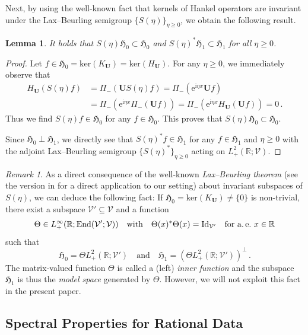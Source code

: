 \documentclass[11pt,reqno]{amsart}
\newtheorem{lem}{Lemma}[section]
\theoremstyle{definition}
\theoremstyle{remark}
\theoremstyle{remark}
\newtheorem*{remark*}{Remark}
\numberwithin{equation}{section}
\newcommand{\Hfr}{\mathfrak{H}}
\newcommand{\R}{\mathbb{R}}
\newcommand{\VV}{\mathcal{V}}
\renewcommand{\ker}{\mathrm{ker}}
\newcommand{\ii}{\mathrm{i}}
\newcommand{\eu}{\mathrm{e}}
\newcommand{\Ub}{\mathbf{U}}
\newcommand{\id}{\mathrm{Id}}
\begin{document}
Next, by using the well-known fact that kernels of Hankel operators are invariant under the Lax--Beurling semigroup $\{ S(\eta) \}_{\eta \geq 0}$, we obtain the following result.

\begin{lem} \label{lem:S_inv}
It holds that $S(\eta)\Hfr_0 \subset \Hfr_0$ and $S(\eta)^* \Hfr_1 \subset \Hfr_1$ for all $\eta \geq 0$.
\end{lem}

\begin{proof}
Let $f \in \Hfr_0 = \ker(K_{\Ub}) = \ker(H_{\Ub})$. For any $\eta \geq 0$, we immediately observe that
\begin{align*}
H_{\Ub}(S(\eta) f) & = \Pi_-(\Ub S(\eta) f) = \Pi_- (\eu^{\ii \eta x} \Ub f) \\
& = \Pi_- (\eu^{\ii \eta x} \Pi_-(\Ub f)) = \Pi_- (\eu^{\ii \eta x} H_{\Ub}(\Ub f)) = 0 \, .
\end{align*}
Thus we find $S(\eta) f \in \Hfr_0$ for any $f \in \Hfr_0$. This proves that $S(\eta) \Hfr_0 \subset \Hfr_0$. 

Since $\Hfr_0 \perp \Hfr_1$, we directly see that $S(\eta)^* f \in \Hfr_1$ for any $f \in \Hfr_1$ and $\eta \geq 0$ with the adjoint Lax--Beurling semigroup $\{ S(\eta)^* \}_{\eta \geq 0}$ acting on $L^2_+(\R; \VV)$.
\end{proof}

\begin{remark*}
As a direct consequence of the well-known {\em Lax--Beurling theorem} (see the version in \cite{Lax-59} for a direct application to our setting) about invariant subspaces of $S(\eta)$, we can deduce the following fact: If $\Hfr_0 = \ker(K_\Ub) \neq \{ 0 \}$ is non-trivial, there exist a subspace $\VV' \subseteq \VV$ and a function 
$$
\Theta \in L^\infty_+(\R; \mathrm{End}(\VV'; \VV)) \quad \mbox{with} \quad  \Theta(x)^* \Theta(x) = \id_{\VV'} \quad \mbox{for a.\,e.~$x \in \R$}
$$
such that
$$
\Hfr_0 = \Theta L^2_+(\R; \VV') \quad \mbox{and} \quad \Hfr_1 = (\Theta L^2_+(\R; \VV'))^\perp \, .
$$
The matrix-valued function $\Theta$ is called a (left) {\em inner function} and the subspace $\Hfr_1$ is thus the {\em model space} generated by $\Theta$. However, we will not exploit this fact in the present paper.
\end{remark*}


\subsection*{Spectral Properties for Rational Data}
\end{document}
